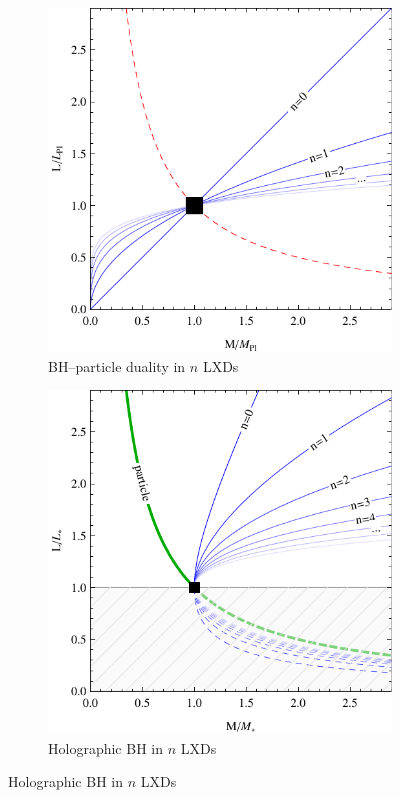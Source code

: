 \documentclass[12pt,a4paper]{report}
\numberwithin{equation}{chapter}
\begin{document}
\begin{figure}
\centering
\begin{subfigure}{0.45\textwidth}
\caption{BH--particle duality in $n$ LXDs}\label{fig:bh-duality-STM-revisited}
\includegraphics[width=\textwidth]{figures/completeness-STM.pdf}
\end{subfigure}%
\hspace{0.03\textwidth}
\begin{subfigure}{0.45\textwidth}
\caption{Holographic BH in $n$ LXDs}\label{fig:bh-duality-holo-B}
\includegraphics[width=\textwidth]{figures/completeness-holoN.pdf}

\end{subfigure}
\end{figure}
\end{document}
